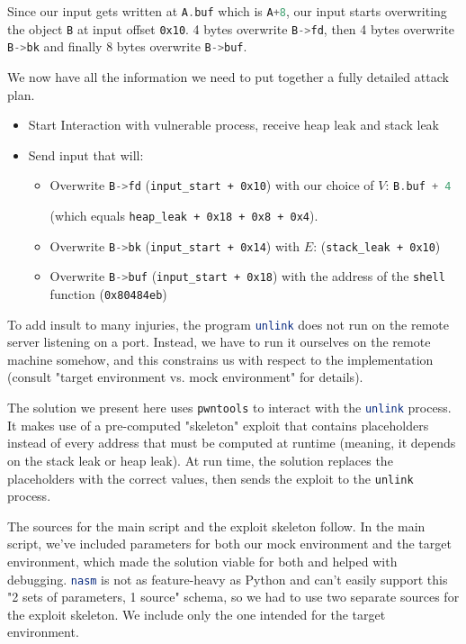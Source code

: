 \documentclass{article}
\newcommand{\xcode}[2]{\colorbox{ubuntuback}{\lstinline[language=#1]|#2|}}
\newcommand{\code}[1]{\colorbox{ubuntuback}{\texttt{#1}}}
\begin{document}
Since our input gets written at \xcode{C}{A.buf} which is \xcode{C}{A+8}, our input starts overwriting the object \xcode{C}{B} at input offset \code{0x10}. 4 bytes overwrite \xcode{C}{B->fd}, then 4 bytes overwrite \xcode{C}{B->bk} and finally 8 bytes overwrite \xcode{C}{B->buf}.

We now have all the information we need to put together a fully detailed attack plan.

\begin{itemize}
    \item Start Interaction with vulnerable process, receive heap leak and stack leak
    \item Send input that will:
        \begin{itemize}
            \item Overwrite \xcode{C}{B->fd} (\code{input\_start + 0x10}) with our choice of $V$: \xcode{C}{B.buf + 4} 

                (which equals \code{heap\_leak + 0x18 + 0x8 + 0x4}).
            \item Overwrite \xcode{C}{B->bk} (\code{input\_start + 0x14}) with $E$: (\code{stack\_leak + 0x10})
            \item Overwrite \xcode{C}{B->buf} (\code{input\_start + 0x18}) with the address of the \xcode{C}{shell} function (\code{0x80484eb})
        \end{itemize}
\end{itemize}

To add insult to many injuries, the program \xcode{bash}{unlink} does not run on the remote server listening on a port. Instead, we have to run it ourselves on the remote machine somehow, and this constrains us with respect to the implementation (consult "target environment vs. mock environment" for details). 

The solution we present here uses \code{pwntools} to interact with the \xcode{bash}{unlink} process. It makes use of a pre-computed "skeleton" exploit that contains placeholders instead of every address that must be computed at runtime (meaning, it depends on the stack leak or heap leak). At run time, the solution replaces the placeholders with the correct values, then sends the exploit to the \xcode{C}{unlink} process.

The sources for the main script and the exploit skeleton follow. In the main script, we've included parameters for both our mock environment and the target environment, which made the solution viable for both and helped with debugging. \xcode{bash}{nasm} is not as feature-heavy as Python and can't easily support this "2 sets of parameters, 1 source" schema, so we had to use two separate sources for the exploit skeleton. We include only the one intended for the target environment.
\end{document}
